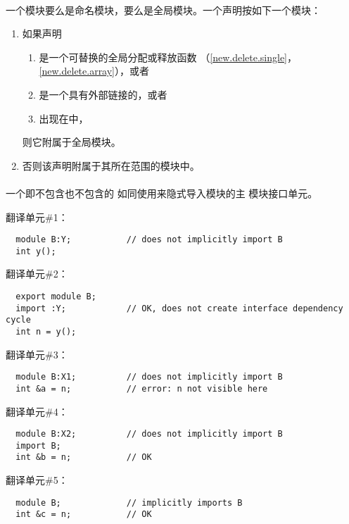 \paragraph{} %
一个模块要么是命名模块，要么是全局模块。一个声明按如下一个模块：
\begin{enumerate}
  \item 如果声明
    \begin{enumerate}
      \item 是一个可替换的全局分配或释放函数
        （\ref{new.delete.single}，\ref{new.delete.array}），或者
      \item 是一个具有外部链接的，或者
      \item 出现在中，
    \end{enumerate}
    则它附属于全局模块。
  \item 否则该声明附属于其所在范围的模块中。
\end{enumerate}

\paragraph{} %
一个即不包含也不包含的
如同使用来隐式导入模块的主
模块接口单元。

\begin{example}

  翻译单元\#1：
  \begin{lstlisting}
  module B:Y;           // does not implicitly import B
  int y();
  \end{lstlisting}
  翻译单元\#2：
  \begin{lstlisting}
  export module B;
  import :Y;            // OK, does not create interface dependency cycle
  int n = y();
  \end{lstlisting}
  翻译单元\#3：
  \begin{lstlisting}
  module B:X1;          // does not implicitly import B
  int &a = n;           // error: n not visible here
  \end{lstlisting}
  翻译单元\#4：
  \begin{lstlisting}
  module B:X2;          // does not implicitly import B
  import B;
  int &b = n;           // OK
  \end{lstlisting}
  翻译单元\#5：
  \begin{lstlisting}
  module B;             // implicitly imports B
  int &c = n;           // OK
  \end{lstlisting}
\end{example}
